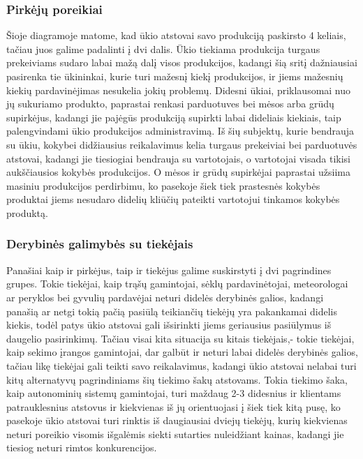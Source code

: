 \documentclass[oneside]{VUMIFPSkursinis}
\begin{document}
\subsubsection{Pirkėjų poreikiai}
Šioje diagramoje matome, kad ūkio atstovai savo produkciją paskirsto 4 keliais, tačiau juos galime padalinti į dvi dalis. Ūkio tiekiama produkcija turgaus prekeiviams sudaro labai mažą dalį visos produkcijos, kadangi šią sritį dažniausiai pasirenka tie ūkininkai, kurie turi mažesnį kiekį produkcijos, ir jiems mažesnių kiekių pardavinėjimas nesukelia jokių problemų. Didesni ūkiai, priklausomai nuo jų sukuriamo produkto, paprastai renkasi parduotuves bei mėsos arba grūdų supirkėjus, kadangi jie pajėgūs produkciją supirkti labai dideliais kiekiais, taip palengvindami ūkio produkcijos administravimą. Iš šių subjektų, kurie bendrauja su ūkiu, kokybei didžiausius reikalavimus kelia turgaus prekeiviai bei parduotuvės atstovai, kadangi jie tiesiogiai bendrauja su vartotojais, o vartotojai visada tikisi aukščiausios kokybės produkcijos. O mėsos ir grūdų supirkėjai paprastai užsiima masiniu produkcijos perdirbimu, ko pasekoje šiek tiek prastesnės kokybės produktai jiems nesudaro didelių kliūčių pateikti vartotojui tinkamos kokybės produktą.
\subsubsection{Derybinės galimybės su tiekėjais}
Panašiai kaip ir pirkėjus, taip ir tiekėjus galime suskirstyti į dvi pagrindines grupes. Tokie tiekėjai, kaip trąšų gamintojai, sėklų pardavinėtojai, meteorologai ar peryklos bei gyvulių pardavėjai neturi didelės derybinės galios, kadangi panašią ar netgi tokią pačią pasiūlą teikiančių tiekėjų yra pakankamai didelis kiekis, todėl patys ūkio atstovai gali išsirinkti jiems geriausius pasiūlymus iš daugelio pasirinkimų. Tačiau visai kita situacija su kitais tiekėjais,- tokie tiekėjai, kaip sekimo įrangos gamintojai, dar galbūt ir neturi labai didelės derybinės galios, tačiau likę tiekėjai gali teikti savo reikalavimus, kadangi ūkio atstovai nelabai turi kitų alternatyvų pagrindiniams šių tiekimo šakų atstovams. Tokia tiekimo šaka, kaip autonominių sistemų gamintojai, turi maždaug 2-3 didesnius ir klientams patrauklesnius atstovus ir kiekvienas iš jų orientuojasi į šiek tiek kitą pusę, ko pasekoje ūkio atstovai turi rinktis iš daugiausiai dviejų tiekėjų, kurių kiekvienas neturi poreikio visomis išgalėmis siekti sutarties nuleidžiant kainas, kadangi jie tiesiog neturi rimtos konkurencijos.
	
\end{document}
